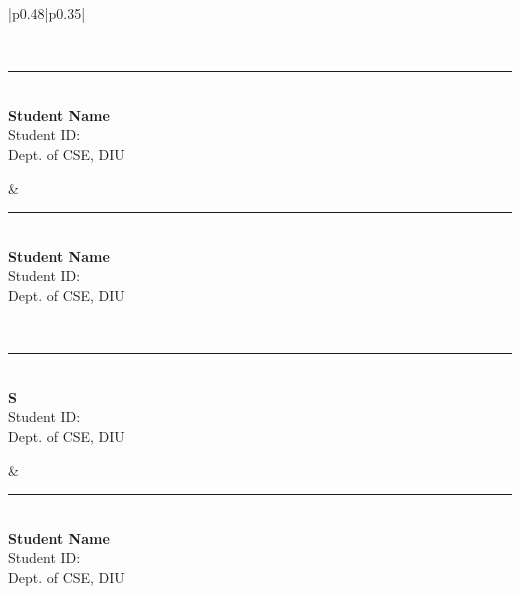 \begin{table}[h!]
\centering
\renewcommand{\arraystretch}{3} %
\setlength{\tabcolsep}{10pt} %

\begin{tabular}{|p{0.48\textwidth}|p{0.35\textwidth}|} %

\hline
{} \\
\hline

\begin{minipage}{\linewidth}
    \centering
    \vspace{1.5cm} %
    \rule{6cm}{0.4pt} %
    \\
    \textbf{Student Name} \\ Student ID: \\ Dept. of CSE, DIU
\end{minipage} &

\begin{minipage}{\linewidth}
    \centering
    \vspace{1.5cm} %
    \rule{6cm}{0.4pt} %
    \\
    \textbf{Student Name} \\ Student ID: \\ Dept. of CSE, DIU
\end{minipage} \\
\hline

\begin{minipage}{\linewidth}
    \centering
    \vspace{1.5cm} %
    \rule{6cm}{0.4pt} %
    \\
    \textbf{S} \\ Student ID: \\ Dept. of CSE, DIU
\end{minipage} &

\begin{minipage}{\linewidth}
    \centering
    \vspace{1.5cm} %
    \rule{6cm}{0.4pt} %
    \\
    \textbf{Student Name} \\ Student ID: \\ Dept. of CSE, DIU
\end{minipage} \\
\hline

\end{tabular}

\end{table}
